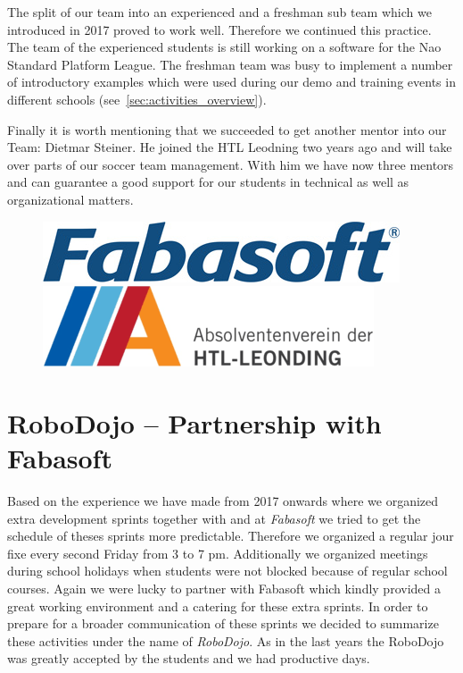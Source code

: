 \documentclass[11pt]{article}
\begin{document}
The split of our team into an experienced and a freshman sub team which we introduced in 2017 proved to work well. Therefore we continued this practice. The team of the experienced students is still  working on a software for the Nao Standard Platform League. The freshman team was busy to implement a number of introductory examples which were used during our demo and training events in different schools (see~\ref{sec:activities_overview}).

Finally it is worth mentioning that we succeeded to get another mentor into our Team: Dietmar Steiner. He joined the HTL Leodning two years ago and will take over parts of our soccer team management. With him we have now three mentors and can guarantee a good support for our students in technical as well as organizational matters.

\begin{figure}[b]
\begin{center}
\includegraphics[scale=0.38]{img/fabasoft.png}
\hfill
\includegraphics[scale=0.38]{img/absleoLogo.png}
\end{center}
\end{figure}

\section{RoboDojo – Partnership with Fabasoft}
Based on the experience we have made from 2017 onwards where we organized extra development sprints together with and at {\em Fabasoft} we tried to get the schedule of theses sprints more predictable. Therefore we organized a regular jour fixe every second Friday from 3 to 7 pm. Additionally we organized meetings during school holidays when students were not blocked because of regular school courses. Again we were lucky to partner with Fabasoft which kindly provided a great working environment and a catering for these extra sprints. In order to prepare for a broader communication of these sprints we decided to summarize these activities under the name of {\em RoboDojo}. As in the last years the RoboDojo was greatly accepted by the students and we had productive days.
\end{document}

